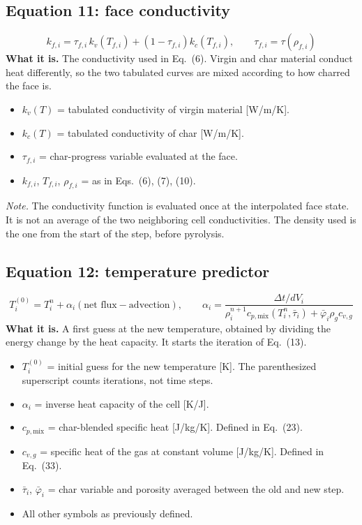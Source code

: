 \documentclass[11pt]{article}
\begin{document}
\subsection*{Equation 11: face conductivity}
\begin{equation}
k_{f,i} = \tau_{f,i}\, k_v(T_{f,i}) + \left(1 - \tau_{f,i}\right) k_c(T_{f,i}),
\qquad \tau_{f,i} = \tau(\rho_{f,i})
\end{equation}
\textbf{What it is.} The conductivity used in Eq.~(6). Virgin and char material
conduct heat differently, so the two tabulated curves are mixed according to how
charred the face is.
\begin{itemize}
  \item $k_v(T)$ = tabulated conductivity of virgin material [W/m/K].
  \item $k_c(T)$ = tabulated conductivity of char [W/m/K].
  \item $\tau_{f,i}$ = char-progress variable evaluated at the face.
  \item $k_{f,i}$, $T_{f,i}$, $\rho_{f,i}$ = as in Eqs.~(6), (7), (10).
\end{itemize}
\textit{Note.} The conductivity function is evaluated once at the interpolated
face state. It is not an average of the two neighboring cell conductivities. The
density used is the one from the start of the step, before pyrolysis.

\subsection*{Equation 12: temperature predictor}
\begin{equation}
T^{(0)}_i = T^n_i + \alpha_i\left(\text{net flux} - \text{advection}\right),
\qquad
\alpha_i = \frac{\Delta t / dV_i}{\rho^{n+1}_i c_{p,\mathrm{mix}}(T^n_i, \bar\tau_i)
  + \bar\varphi_i \rho_g c_{v,g}}
\end{equation}
\textbf{What it is.} A first guess at the new temperature, obtained by dividing
the energy change by the heat capacity. It starts the iteration of Eq.~(13).
\begin{itemize}
  \item $T^{(0)}_i$ = initial guess for the new temperature [K]. The parenthesized
        superscript counts iterations, not time steps.
  \item $\alpha_i$ = inverse heat capacity of the cell [K/J].
  \item $c_{p,\mathrm{mix}}$ = char-blended specific heat [J/kg/K]. Defined in
        Eq.~(23).
  \item $c_{v,g}$ = specific heat of the gas at constant volume [J/kg/K].
        Defined in Eq.~(33).
  \item $\bar\tau_i$, $\bar\varphi_i$ = char variable and porosity averaged
        between the old and new step.
  \item All other symbols as previously defined.
\end{itemize}
\end{document}

